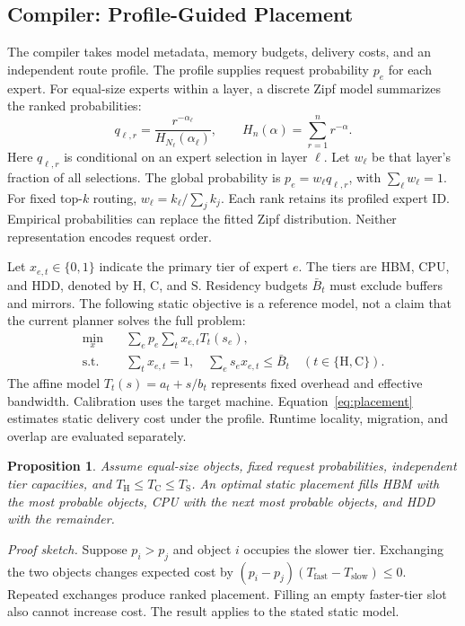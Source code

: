 \documentclass[conference,9pt,letterpaper]{IEEEtran}
\newtheorem{proposition}{Proposition}
\begin{document}
\subsection{Compiler: Profile-Guided Placement}
The compiler takes model metadata, memory budgets, delivery costs, and an independent route profile. The profile supplies request probability $p_e$ for each expert. For equal-size experts within a layer, a discrete Zipf model summarizes the ranked probabilities:
\begin{equation}
 q_{\ell,r}=\frac{r^{-\alpha_\ell}}{H_{N_\ell}(\alpha_\ell)},\qquad
 H_n(\alpha)=\sum_{r=1}^{n}r^{-\alpha}.
\end{equation}
Here $q_{\ell,r}$ is conditional on an expert selection in layer $\ell$. Let $w_\ell$ be that layer's fraction of all selections. The global probability is $p_e=w_\ell q_{\ell,r}$, with $\sum_\ell w_\ell=1$. For fixed top-$k$ routing, $w_\ell=k_\ell/\sum_j k_j$. Each rank retains its profiled expert ID. Empirical probabilities can replace the fitted Zipf distribution. Neither representation encodes request order.

Let $x_{e,t}\in\{0,1\}$ indicate the primary tier of expert $e$. The tiers are HBM, CPU, and HDD, denoted by $\mathrm H$, $\mathrm C$, and $\mathrm S$. Residency budgets $\bar B_t$ must exclude buffers and mirrors. The following static objective is a reference model, not a claim that the current planner solves the full problem:
\begin{align}
 \min_x\quad &\sum_e p_e\sum_t x_{e,t}T_t(s_e),\label{eq:placement}\\
 \text{s.t.}\quad&\sum_t x_{e,t}=1,\quad
 \sum_e s_e x_{e,t}\le \bar B_t\quad(t\in\{\mathrm H,\mathrm C\}).\nonumber
\end{align}
The affine model $T_t(s)=a_t+s/b_t$ represents fixed overhead and effective bandwidth. Calibration uses the target machine. Equation~\ref{eq:placement} estimates static delivery cost under the profile. Runtime locality, migration, and overlap are evaluated separately.

\begin{proposition}
Assume equal-size objects, fixed request probabilities, independent tier capacities, and $T_{\mathrm H}\le T_{\mathrm C}\le T_{\mathrm S}$. An optimal static placement fills HBM with the most probable objects, CPU with the next most probable objects, and HDD with the remainder.
\end{proposition}
\noindent\emph{Proof sketch.} Suppose $p_i>p_j$ and object $i$ occupies the slower tier. Exchanging the two objects changes expected cost by $(p_i-p_j)(T_{\mathrm{fast}}-T_{\mathrm{slow}})\le0$. Repeated exchanges produce ranked placement. Filling an empty faster-tier slot also cannot increase cost. The result applies to the stated static model.
\end{document}

